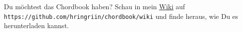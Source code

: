 
\begin{center}
    \begin{minipage}[h]{0.7\textwidth}
        \begin{tcolorbox}[colback=blue!7,colframe=blue!70!black,fonttitle=\bfseries,title=Download]
            Du m\"{o}chtest das Chordbook haben? Schau in mein
            \href{https://github.com/hringriin/chordbook/wiki}{Wiki} auf
            \texttt{https://github.com/hringriin/chordbook/wiki} und finde
            heraus, wie Du es herunterladen kannst.
        \end{tcolorbox}
    \end{minipage}
\end{center}
